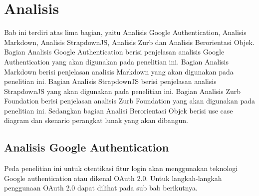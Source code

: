 \chapter{Analisis}
\label{chap:analisis}

Bab ini terdiri atas lima bagian, yaitu Analisis Google Authentication, Analisis Markdown, Analisis StrapdownJS, Analisis Zurb dan Analisis Berorientasi Objek. Bagian Analisis Google Authentication berisi penjelasan analisis Google Authentication yang akan digunakan pada penelitian ini. Bagian Analisis Markdown berisi penjelasan analisis Markdown yang akan digunakan pada penelitian ini. Bagian Analisis StrapdownJS berisi penjelasan analisis StrapdownJS yang akan digunakan pada penelitian ini. Bagian Analisis Zurb Foundation berisi penjelasan analisis Zurb Foundation yang akan digunakan pada penelitian ini. Sedangkan bagian Analisi Berorientasi Objek berisi use case diagram dan skenario perangkat lunak yang akan dibangun.

\section{Analisis Google Authentication}
\label{sec:analisisGoogleAuthentication}

Peda penelitian ini untuk otentikasi fitur login akan menggunakan teknologi Google authentication atau dikenal OAuth 2.0. Untuk langkah-langkah penggunaan OAuth 2.0 dapat dilihat pada sub bab berikutnya.

